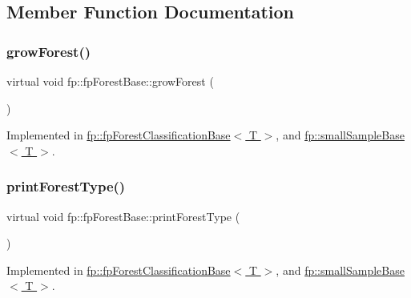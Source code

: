 \subsection{Member Function Documentation}
\mbox{\label{classfp_1_1fpForestBase_a05b1d924a559536083ee7a8cf3ea542d}} 
\subsubsection{\texorpdfstring{grow\+Forest()}{growForest()}}
{\footnotesize\ttfamily virtual void fp\+::fp\+Forest\+Base\+::grow\+Forest (\begin{DoxyParamCaption}{ }\end{DoxyParamCaption})\hspace{0.3cm}{\ttfamily [pure virtual]}}



Implemented in \hyperlink{classfp_1_1fpForestClassificationBase_a706225fdbef8c71fb022f4c3446b388d}{fp\+::fp\+Forest\+Classification\+Base$<$ T $>$}, and \hyperlink{classfp_1_1smallSampleBase_a8c5b6a0f2c8aeb32a322cc5e237c60af}{fp\+::small\+Sample\+Base$<$ T $>$}.

\mbox{\label{classfp_1_1fpForestBase_a5e200f603cca94bb5d9f357489f07e97}} 
\subsubsection{\texorpdfstring{print\+Forest\+Type()}{printForestType()}}
{\footnotesize\ttfamily virtual void fp\+::fp\+Forest\+Base\+::print\+Forest\+Type (\begin{DoxyParamCaption}{ }\end{DoxyParamCaption})\hspace{0.3cm}{\ttfamily [pure virtual]}}



Implemented in \hyperlink{classfp_1_1fpForestClassificationBase_a6b5243d32b468308a4f013ad5a9df2dd}{fp\+::fp\+Forest\+Classification\+Base$<$ T $>$}, and \hyperlink{classfp_1_1smallSampleBase_a1e3244a9a15d53d38e6c9ca78d8d062e}{fp\+::small\+Sample\+Base$<$ T $>$}.

